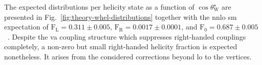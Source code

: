 
The expected distributions per helicity state as a function of $\cos\theta^\star_\mathrm{W}$ are presented in Fig.~\ref{fig:theory-whel-distributions} together with the \gls{nnlo} \gls{sm} expectation of $\mathrm{F}_\mathrm{L}=0.311\pm0.005$, $\mathrm{F}_\mathrm{R}=0.0017\pm0.0001$, and $\mathrm{F}_{0}=0.687\pm0.005$~\cite{Czarnecki:2010gb}. Despite the \gls{va} coupling structure which suppresses right-handed couplings completely, a non-zero but small right-handed helicity fraction is expected nonetheless. It arises from the considered corrections beyond \gls{lo} to the vertices.


